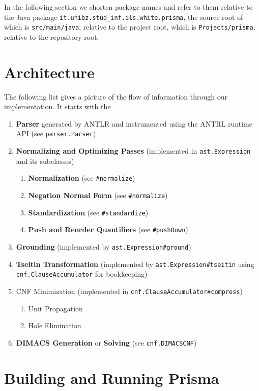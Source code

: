\documentclass{llncs}
\begin{document}
In the following section we shorten package names and refer to them relative to the Java package \texttt{it.unibz.stud\_inf.ils.white.prisma}, the source root of which is \texttt{src/main/java}, relative to the project root, which is \texttt{Projects/prisma}, relative to the repository root.

\section{Architecture}
\label{sec:arch}

The following list gives a picture of the flow of information through our implementation. It starts with the 

\begin{enumerate}
	\item{\textbf{Parser} generated by ANTLR and instrumented using the ANTRL runtime API (see \texttt{parser.Parser})}
	\item{\textbf{Normalizing and Optimizing Passes} (implemented in \texttt{ast.Expression} and its subclasses)
		\begin{enumerate}
			\item{\textbf{Normalization} (see \texttt{\#normalize})}
			\item{\textbf{Negation Normal Form} (see \texttt{\#normalize})}
			\item{\textbf{Standardization} (see \texttt{\#standardize})}
			\item{\textbf{Push and Reorder Quantifiers} (see \texttt{\#pushDown})}
		\end{enumerate}
	}
	\item{\textbf{Grounding} (implemented by \texttt{ast.Expression\#ground})}
	\item{\textbf{Tseitin Transformation} (implemented by \texttt{ast.Expression\#tseitin} using \texttt{cnf.ClauseAccumulator} for bookkeeping)}
	\item{CNF Minimization (implemented in \texttt{cnf.ClauseAccumulator\#compress})
		\begin{enumerate}
			\item{Unit Propagation}
			\item{Hole Elimination}
		\end{enumerate}
	}
	\item{\textbf{DIMACS Generation} or \textbf{Solving} (see \texttt{cnf.DIMACSCNF})}
\end{enumerate}

\section{Building and Running Prisma}
\label{sec:buildnrun}
\end{document}
